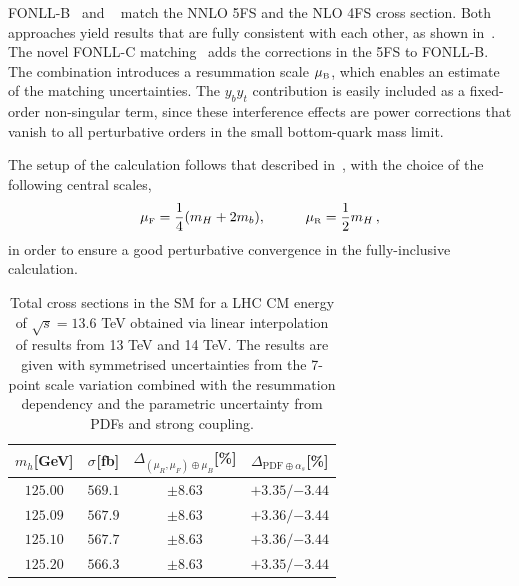 \documentclass[11pt,a4paper]{article}
\begin{document}
FONLL-B~\cite{forte:2015hba,forte:2016sja} and \nlonnllpart{}~\cite{Bonvini:2015pxa,Bonvini:2016fgf} match the NNLO 5FS and the NLO 4FS cross section.
Both approaches yield results that are fully consistent with each other, as shown in~. 
The novel FONLL-C matching~\cite{Duhr:2020kzd} adds the \fnnnlo{} corrections in the 5FS to FONLL-B. The \nlonnllpart{} combination introduces a resummation scale $\muB$, which enables an estimate of the 
matching uncertainties.
The $y_by_t$  contribution is easily included as a fixed-order non-singular term, since these interference effects are power corrections that 
vanish to all perturbative orders in the small bottom-quark mass limit.

The setup of the calculation follows that described in~, with the choice of the following central scales,
\begin{align}
\muF=\frac{1}{4}(m_H+2m_b),\hspace{1cm}\muR=\frac{1}{2}m_H\,,
\end{align}
in order to ensure a good perturbative convergence in the fully-inclusive calculation.

\begin{table}[t]
\begin{center}%
\begin{small}%
\begin{tabular}{|c|c|c|c|}%
\hline
$m_h$[GeV] & $\sigma^{}$[fb] & $\Delta_{\left(\mu_{R},\mu_{F}\right)\oplus\mu_{B}}$[\%] & $\Delta_{\mathrm{PDF}\oplus\alpha_s}$[\%]  \\\hline\hline
$125.00$ & $569.1$ & $\pm8.63$ & ${{+3.35}}/{-3.44}$ \\\hline
$125.09$ & $567.9$ & $\pm8.63$ & ${{+3.36}}/{-3.44}$ \\\hline
$125.10$ & $567.7$ & $\pm8.63$ & ${{+3.36}}/{-3.44}$ \\\hline
$125.20$ & $566.3$ & $\pm8.63$ & ${{+3.35}}/{-3.44}$ \\\hline
\end{tabular}%
\end{small}%
\end{center}%
\caption{Total \bbH{} cross sections in the SM for a LHC CM energy of $\sqrt{s}=13.6$ TeV obtained via linear interpolation of results from 13 TeV and 14 TeV. The results are given with symmetrised uncertainties from the 7-point scale variation combined with the resummation dependency and the parametric uncertainty from PDFs and strong coupling.}
\label{tab:bbH136lin}
\end{table}
\end{document}
